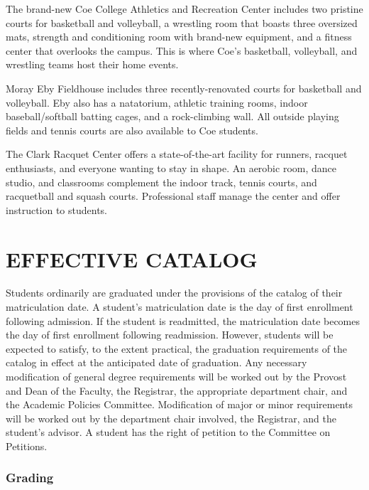 \documentclass[
  letterpaper,
]{scrbook}
\renewcommand{\part}[1]{\addcontentsline{toc}{part}{#1}}
\begin{document}
The brand-new Coe College Athletics and Recreation Center includes two
pristine courts for basketball and volleyball, a wrestling room that
boasts three oversized mats, strength and conditioning room with
brand-new equipment, and a fitness center that overlooks the campus.
This is where Coe's basketball, volleyball, and wrestling teams host
their home events.

Moray Eby Fieldhouse includes three recently-renovated courts for
basketball and volleyball. Eby also has a natatorium, athletic training
rooms, indoor baseball/softball batting cages, and a rock-climbing wall.
All outside playing fields and tennis courts are also available to Coe
students.

The Clark Racquet Center offers a state-of-the-art facility for runners,
racquet enthusiasts, and everyone wanting to stay in shape. An aerobic
room, dance studio, and classrooms complement the indoor track, tennis
courts, and racquetball and squash courts. Professional staff manage the
center and offer instruction to students.

\part{COLLEGE REGULATIONS AND POLICIES}

\chapter{EFFECTIVE CATALOG}\label{effective-catalog}

Students ordinarily are graduated under the provisions of the catalog of
their matriculation date. A student's matriculation date is the day of
first enrollment following admission. If the student is readmitted, the
matriculation date becomes the day of first enrollment following
readmission. However, students will be expected to satisfy, to the
extent practical, the graduation requirements of the catalog in effect
at the anticipated date of graduation. Any necessary modification of
general degree requirements will be worked out by the Provost and Dean
of the Faculty, the Registrar, the appropriate department chair, and the
Academic Policies Committee. Modification of major or minor requirements
will be worked out by the department chair involved, the Registrar, and
the student's advisor. A student has the right of petition to the
Committee on Petitions.

\subsection{Grading}\label{sec-grading}
\end{document}
